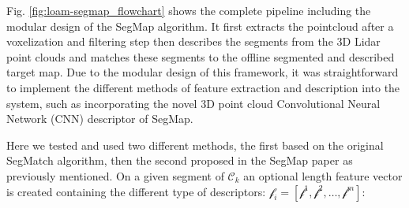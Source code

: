 \documentclass[letterpaper, 10 pt, conference]{ieeeconf}  %
\begin{document}
Fig. \ref{fig:loam-segmap_flowchart} shows the complete pipeline including the modular design of the SegMap algorithm. It first extracts the pointcloud after a voxelization and filtering step then describes the segments from the 3D Lidar point clouds and matches these segments to the offline segmented and described target map. Due to the modular design of this framework, it was straightforward to implement the different methods of feature extraction and description into the system, such as incorporating the novel 3D point cloud Convolutional Neural Network (CNN) descriptor of SegMap.


Here we tested and used two different methods, the first based on the original SegMatch algorithm, then the second proposed in the SegMap paper as previously mentioned. 
On a given segment of $\mathcal{C}_k$ an optional length feature vector is created containing the different type of descriptors: $\mathscr{f}_i=[\mathscr{f}^1, \mathscr{f}^2, \dots, \mathscr{f}^m]$:
\end{document}
